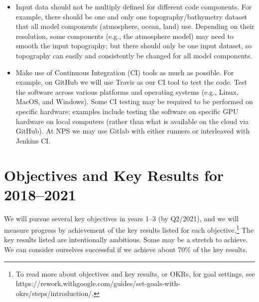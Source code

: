\documentclass{article}
\begin{document}
\begin{itemize}
    \item Input data should not be multiply defined for different code components. For example, there should be one and only one topography/bathymetry dataset that all model components (atmosphere, ocean, land) use. Depending on their resolution, some components (e.g., the atmosphere model) may need to smooth the input topography; but there should only be one input dataset, so topography can easily and consistently be changed for all model components.
    \item Make use of Continuous Integration (CI) tools as much as possible.  For example, on GitHub we will use Travis as our CI tool to test the code. Test the software across various platforms and operating systems (e.g., Linux, MacOS, and Windows).  Some CI testing may be required to be performed on specific hardware; examples include testing the software on specific GPU hardware on local computers (rather than what is available on the cloud via GitHub).  At NPS we may use Gitlab with either runners or interleaved with Jenkins CI.
\end{itemize}

\section{Objectives and Key Results for 2018--2021}

We will pursue several key objectives in years 1--3 (by Q2/2021), and we will measure progress by achievement of the key results listed for each objective.\footnote{To read more about objectives and key results, or OKRs, for goal settings, see https://rework.withgoogle.com/guides/set-goals-with-okrs/steps/introduction/.} The key results listed are intentionally ambitious. Some may be a stretch to achieve. We can consider ourselves successful if we achieve about 70\% of the key results. 
 
\end{document}
